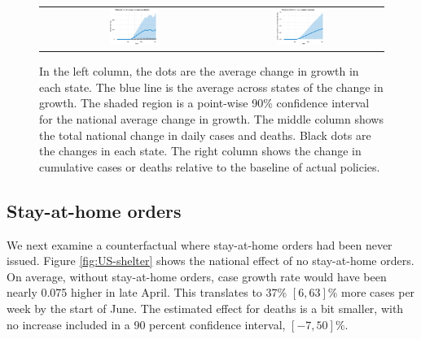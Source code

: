 \documentclass[3p, longtitle]{elsarticle}
\theoremstyle{definition}
\begin{document}
\begin{figure}[ht]
\begin{minipage}{\linewidth}
\begin{tabular}{ccc}
      &
        \includegraphics[width=0.31\textwidth]{tables_and_figures/us-index-dcases_deaths_idx}
      &
        \includegraphics[width=0.31\textwidth]{tables_and_figures/us-index-rcumu_deaths_idx}
    \end{tabular}

    \begin{flushleft}
      \footnotesize In the left column, the dots are the average
      change in growth in each state. The blue line is the average
      across states of the change in growth. The shaded region is a
      point-wise 90\% confidence interval for the national average
      change in growth.  The middle column shows the total national
      change in daily cases and deaths. Black dots are the changes in each
      state.  The right column shows the change in cumulative cases or
      deaths relative to the baseline of actual policies.
    \end{flushleft}
  \end{minipage}
\end{figure}


\subsection{Stay-at-home orders}

We next examine a counterfactual where stay-at-home orders had been never
issued.  Figure \ref{fig:US-shelter} shows the national effect of no
stay-at-home orders. On average, without stay-at-home orders, case
growth rate would have been nearly 0.075 higher in late April. This
translates to 37\% $[6,63]$\% more cases per week by the start of June. The
estimated effect for deaths is a bit smaller, with no
increase included in a 90 percent confidence interval, $[-7,50]$\%.
\end{document}
